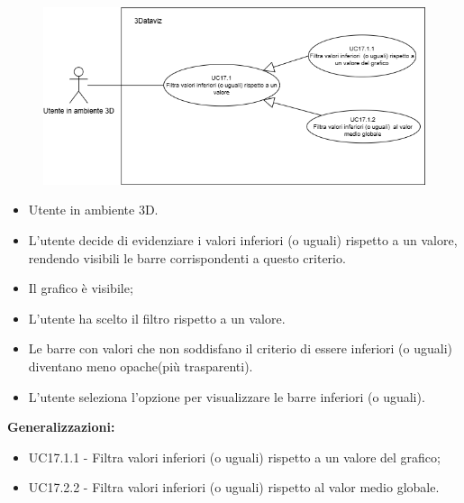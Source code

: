 \begin{figure}[H]\centering
    \includegraphics[scale=0.7]{template/images/UC17.1.png}
    \caption{}
\end{figure}
\UCdsc
{ %
    \begin{itemize}
        \item Utente in ambiente 3D.
    \end{itemize}
}
{ %
    \begin{itemize}
        \item L'utente decide di evidenziare i valori inferiori (o uguali) rispetto a un valore, rendendo visibili le barre corrispondenti a questo criterio.
    \end{itemize}
}
{ %
    \begin{itemize}
        \item Il grafico è visibile;
        \item L'utente ha scelto il filtro rispetto a un valore.
    \end{itemize}
}
{ %
    \begin{itemize}
        \item Le barre con valori che non soddisfano il criterio di essere inferiori (o uguali) diventano meno opache(più trasparenti).
    \end{itemize}
}
{ %
    \begin{itemize}
        \item L'utente seleziona l'opzione per visualizzare le barre inferiori (o uguali).
    \end{itemize}
    \item \textbf{Generalizzazioni:} \begin{itemize}
        \item UC17.1.1 - Filtra valori inferiori (o uguali) rispetto a un valore del grafico;
        \item UC17.2.2 - Filtra valori inferiori (o uguali) rispetto al valor medio globale.
    \end{itemize}
}



